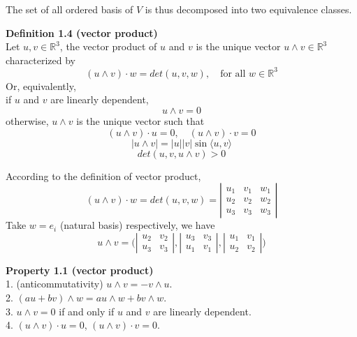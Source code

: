 \documentclass{article}
\begin{document}
\par
The set of all ordered basis of $V$ is thus decomposed into two equivalence classes.

\par
\textbf{Definition 1.4 (vector product)}\\
Let $u, v \in \mathbb{R}^3$, the vector product of $u$ and $v$ is the unique vector $u \wedge v \in \mathbb{R}^3$
characterized by
$$
    (u \wedge v) \cdot w = det(u, v, w), \quad \text{for all }w \in \mathbb{R}^3
$$
Or, equivalently,\\
if $u$ and $v$ are linearly dependent,
$$
    u \wedge v = 0
$$
otherwise, $u \wedge v$ is the unique vector such that
$$
    (u \wedge v) \cdot u = 0,\quad(u \wedge v) \cdot v = 0
$$
$$
    |u \wedge v| = |u||v|\sin \langle u, v \rangle
$$
$$
    det(u, v, u \wedge v) > 0
$$

\par
According to the definition of vector product,
$$
    (u \wedge v) \cdot w = det(u, v, w) = 
    \left|\begin{array}{ccc} 
            u_1 & v_1 & w_1 \\ 
            u_2 & v_2 & w_2\\ 
            u_3 & v_3 & w_3
    \end{array}\right|
$$
Take $w = e_i$ (natural basis) respectively, we have
$$
    u \wedge v = \Biggl(
    \left|\begin{array}{cc} 
        u_2 & v_2 \\ 
        u_3 & v_3
    \end{array}\right|,
    \left|\begin{array}{cc} 
        u_3 & v_3 \\ 
        u_1 & v_1
    \end{array}\right|,
    \left|\begin{array}{cc} 
        u_1 & v_1 \\ 
        u_2 & v_2
    \end{array}\right|
    \Biggr)
$$

\par
\textbf{Property 1.1 (vector product)}\\
1. (anticommutativity) $u \wedge v = - v \wedge u$.\\
2. $(au + bv) \wedge w = au \wedge w + bv \wedge w$.\\
3. $u \wedge v = 0$ if and only if $u$ and $v$ are linearly dependent.\\
4. $(u \wedge v) \cdot u = 0$, $(u \wedge v) \cdot v = 0$.\\
\end{document}
